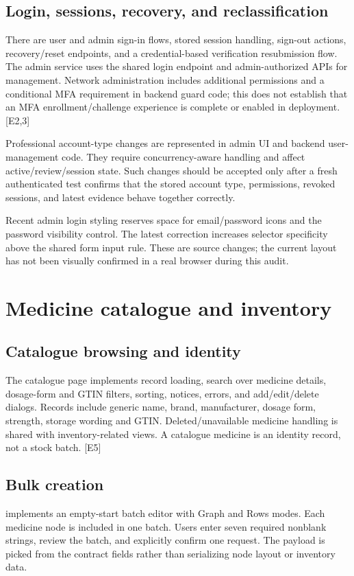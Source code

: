 \documentclass[11pt,a4paper]{article}
\newcommand{\source}[1]{{\small\path{#1}}}
\newcommand{\evidence}[1]{\textcolor{muted}{[E#1]}}
\begin{document}
\subsection{Login, sessions, recovery, and reclassification}
There are user and admin sign-in flows, stored session handling, sign-out actions, recovery/reset endpoints, and a credential-based verification resubmission flow. The admin service uses the shared login endpoint and admin-authorized APIs for management. Network administration includes additional permissions and a conditional MFA requirement in backend guard code; this does not establish that an MFA enrollment/challenge experience is complete or enabled in deployment. \evidence{2,3}

Professional account-type changes are represented in admin UI and backend user-management code. They require concurrency-aware handling and affect active/review/session state. Such changes should be accepted only after a fresh authenticated test confirms that the stored account type, permissions, revoked sessions, and latest evidence behave together correctly.

Recent admin login styling reserves space for email/password icons and the password visibility control. The latest correction increases selector specificity above the shared form input rule. These are source changes; the current layout has not been visually confirmed in a real browser during this audit.

\section{Medicine catalogue and inventory}
\subsection{Catalogue browsing and identity}
The catalogue page implements record loading, search over medicine details, dosage-form and GTIN filters, sorting, notices, errors, and add/edit/delete dialogs. Records include generic name, brand, manufacturer, dosage form, strength, storage wording and GTIN. Deleted/unavailable medicine handling is shared with inventory-related views. A catalogue medicine is an identity record, not a stock batch. \evidence{5}

\subsection{Bulk creation}
\source{BulkMedicineEditor.tsx} implements an empty-start batch editor with Graph and Rows modes. Each medicine node is included in one batch. Users enter seven required nonblank strings, review the batch, and explicitly confirm one request. The payload is picked from the contract fields rather than serializing node layout or inventory data.
\end{document}
